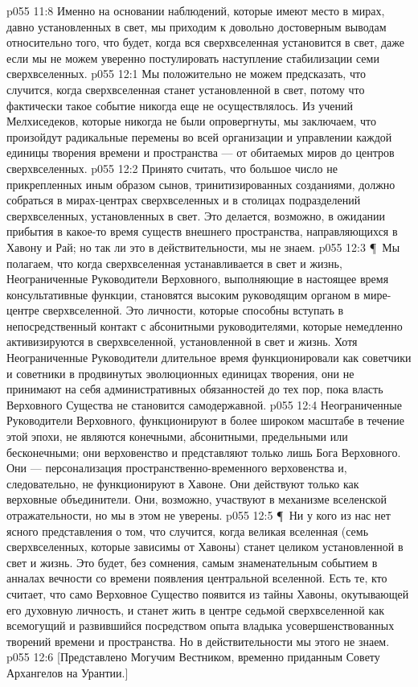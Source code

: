 \vs p055 11:8 Именно на основании наблюдений, которые имеют место в мирах, давно установленных в свет, мы приходим к довольно достоверным выводам относительно того, что будет, когда вся сверхвселенная установится в свет, даже если мы не можем уверенно постулировать наступление стабилизации семи сверхвселенных.
\vs p055 12:1 Мы положительно не можем предсказать, что случится, когда сверхвселенная станет установленной в свет, потому что фактически такое событие никогда еще не осуществлялось. Из учений Мелхиседеков, которые никогда не были опровергнуты, мы заключаем, что произойдут радикальные перемены во всей организации и управлении каждой единицы творения времени и пространства --- от обитаемых миров до центров сверхвселенных.
\vs p055 12:2 Принято считать, что большое число не прикрепленных иным образом сынов, тринитизированных созданиями, должно собраться в мирах\hyp{}центрах сверхвселенных и в столицах подразделений сверхвселенных, установленных в свет. Это делается, возможно, в ожидании прибытия в какое\hyp{}то время существ внешнего пространства, направляющихся в Хавону и Рай; но так ли это в действительности, мы не знаем.
\vs p055 12:3 \P\ Мы полагаем, что когда сверхвселенная устанавливается в свет и жизнь, Неограниченные Руководители Верховного, выполняющие в настоящее время консультативные функции, становятся высоким руководящим органом в мире\hyp{}центре сверхвселенной. Это личности, которые способны вступать в непосредственный контакт с абсонитными руководителями, которые немедленно активизируются в сверхвселенной, установленной в свет и жизнь. Хотя Неограниченные Руководители длительное время функционировали как советчики и советники в продвинутых эволюционных единицах творения, они не принимают на себя административных обязанностей до тех пор, пока власть Верховного Существа не становится самодержавной.
\vs p055 12:4 Неограниченные Руководители Верховного, функционируют в более широком масштабе в течение этой эпохи, не являются конечными, абсонитными, предельными или бесконечными; они  верховенство и представляют только лишь Бога Верховного. Они --- персонализация пространственно\hyp{}временного верховенства и, следовательно, не функционируют в Хавоне. Они действуют только как верховные объединители. Они, возможно, участвуют в механизме вселенской отражательности, но мы в этом не уверены.
\vs p055 12:5 \P\ Ни у кого из нас нет ясного представления о том, что случится, когда великая вселенная (семь сверхвселенных, которые зависимы от Хавоны) станет целиком установленной в свет и жизнь. Это будет, без сомнения, самым знаменательным событием в анналах вечности со времени появления центральной вселенной. Есть те, кто считает, что само Верховное Существо появится из тайны Хавоны, окутывающей его духовную личность, и станет жить в центре седьмой сверхвселенной как всемогущий и развившийся посредством опыта владыка усовершенствованных творений времени и пространства. Но в действительности мы этого не знаем.
\vs p055 12:6 [Представлено Могучим Вестником, временно приданным Совету Архангелов на Урантии.]
